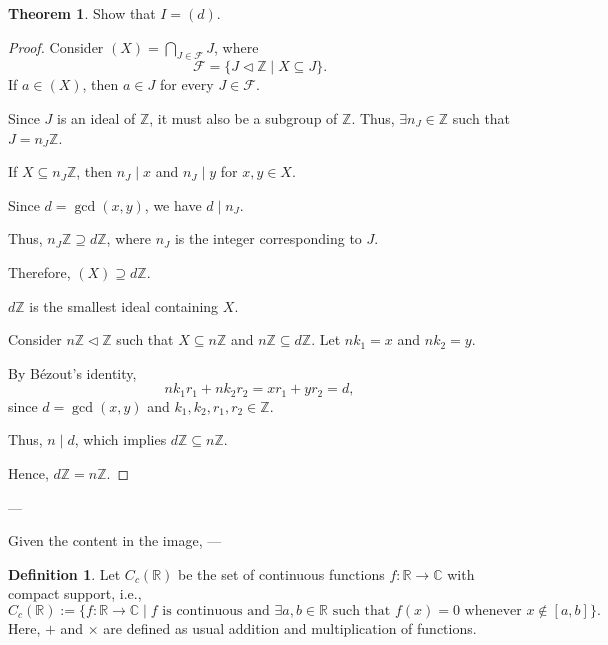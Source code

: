 \documentclass[11pt]{article}
\theoremstyle{definition}
\newtheorem{definition}{Definition}[section]
\newtheorem{theorem}{Theorem}[section]
\theoremstyle{remark}
\begin{document}
\begin{theorem}\label{thm:ideal_gcd}
Show that $I = (d)$.
\end{theorem}

\begin{proof}
Consider $(X) = \bigcap_{J \in \mathcal{F}} J$, where
\[
\mathcal{F} = \{ J \triangleleft \mathbb{Z} \mid X \subseteq J \}.
\]
If $a \in (X)$, then $a \in J$ for every $J \in \mathcal{F}$.

Since $J$ is an ideal of $\mathbb{Z}$, it must also be a subgroup of $\mathbb{Z}$. Thus, $\exists n_J \in \mathbb{Z}$ such that $J = n_J \mathbb{Z}$.

If $X \subseteq n_J \mathbb{Z}$, then $n_J \mid x$ and $n_J \mid y$ for $x, y \in X$.

Since $d = \gcd(x, y)$, we have $d \mid n_J$.

Thus, $n_J \mathbb{Z} \supseteq d \mathbb{Z}$, where $n_J$ is the integer corresponding to $J$.

Therefore, $(X) \supseteq d \mathbb{Z}$.

\begin{claim}\label{claim:smallest_ideal}
$d \mathbb{Z}$ is the smallest ideal containing $X$.
\end{claim}

Consider $n \mathbb{Z} \triangleleft \mathbb{Z}$ such that $X \subseteq n \mathbb{Z}$ and $n \mathbb{Z} \subseteq d \mathbb{Z}$. Let $n k_1 = x$ and $n k_2 = y$.

By Bézout's identity,
\[
n k_1 r_1 + n k_2 r_2 = x r_1 + y r_2 = d,
\]
since $d = \gcd(x, y)$ and $k_1, k_2, r_1, r_2 \in \mathbb{Z}$.

Thus, $n \mid d$, which implies $d \mathbb{Z} \subseteq n \mathbb{Z}$.

Hence, $d \mathbb{Z} = n \mathbb{Z}$.
\end{proof}

---

Given the content in the image, 
---

\begin{definition}\label{def:ccir}
Let $C_c(\mathbb{R})$ be the set of continuous functions $f: \mathbb{R} \to \mathbb{C}$ with compact support, i.e.,
\[
C_c(\mathbb{R}) := \{ f : \mathbb{R} \to \mathbb{C} \mid f \text{ is continuous and } \exists a, b \in \mathbb{R} \text{ such that } f(x) = 0 \text{ whenever } x \notin [a, b] \}.
\]
Here, $+$ and $\times$ are defined as usual addition and multiplication of functions.
\end{definition}
\end{document}
